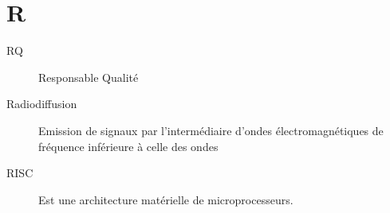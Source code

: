 \section{R}

\begin{description}

\item[RQ] Responsable Qualité

\item[Radiodiffusion] Emission de signaux par l'intermédiaire d'ondes électromagnétiques de fréquence inférieure à celle des ondes 

\item[RISC] Est une architecture matérielle de microprocesseurs.


\end{description}
